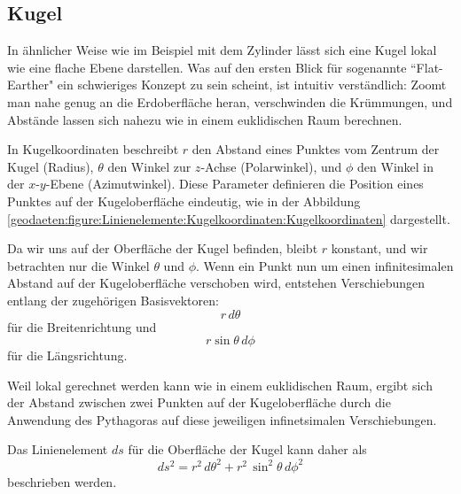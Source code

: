 %
%
%
%
\subsection{Kugel\label{geodaeten:section:Linienelement:Kugel}}

In ähnlicher Weise wie im Beispiel mit dem Zylinder lässt sich eine Kugel lokal wie eine flache Ebene darstellen.
Was auf den ersten Blick für sogenannte ``Flat-Earther" ein schwieriges Konzept zu sein scheint, ist intuitiv verständlich:
Zoomt man nahe genug an die Erdoberfläche heran, verschwinden die Krümmungen, und Abstände lassen sich nahezu wie in einem euklidischen Raum berechnen.

In Kugelkoordinaten beschreibt $r$ den Abstand eines Punktes vom Zentrum der Kugel (Radius), $\theta$ den Winkel zur $z$-Achse (Polarwinkel), und $\phi$ den Winkel in der $x$-$y$-Ebene (Azimutwinkel).
Diese Parameter definieren die Position eines Punktes auf der Kugeloberfläche eindeutig, wie in der Abbildung \ref{geodaeten:figure:Linienelemente:Kugelkoordinaten:Kugelkoordinaten} dargestellt.

Da wir uns auf der Oberfläche der Kugel befinden, bleibt $r$ konstant, und wir betrachten nur die Winkel $\theta$ und $\phi$.
Wenn ein Punkt nun um einen infinitesimalen Abstand auf der Kugeloberfläche verschoben wird, entstehen Verschiebungen entlang der zugehörigen Basisvektoren:
\begin{equation}
	r \, d\theta
\end{equation}
für die Breitenrichtung und
\begin{equation}
	r \sin\theta \, d\phi
\end{equation} 
für die Längsrichtung.

Weil lokal gerechnet werden kann wie in einem euklidischen Raum, ergibt sich der Abstand zwischen zwei Punkten auf der Kugeloberfläche durch die Anwendung des Pythagoras auf diese jeweiligen infinetsimalen Verschiebungen.

Das Linienelement $ds$ für die Oberfläche der Kugel kann daher als
\begin{equation}
	ds^2 = r^2 \, d\theta^2 + r^2 \, \sin^2\theta \, d\phi^2
\end{equation}
beschrieben werden.

